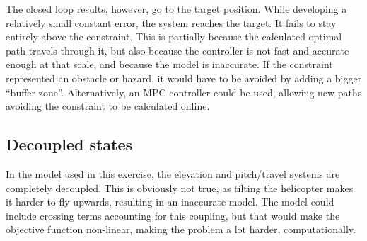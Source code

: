 The closed loop results, however, go to the target position. While developing a relatively small constant error, the system reaches the target. It fails to stay entirely above the constraint. This is partially because the calculated optimal path travels through it, but also because the controller is not fast and accurate enough at that scale, and because the model is inaccurate. If the constraint represented an obstacle or hazard, it would have to be avoided by adding a bigger ``buffer zone''. Alternatively, an MPC controller could be used, allowing new paths avoiding the constraint to be calculated online.

\subsection{Decoupled states}
In the model used in this exercise, the elevation and pitch/travel systems are completely decoupled. This is obviously not true, as tilting the helicopter makes it harder to fly upwards, resulting in an inaccurate model. The model could include crossing terms accounting for this coupling, but that would make the objective function non-linear, making the problem a lot harder, computationally.